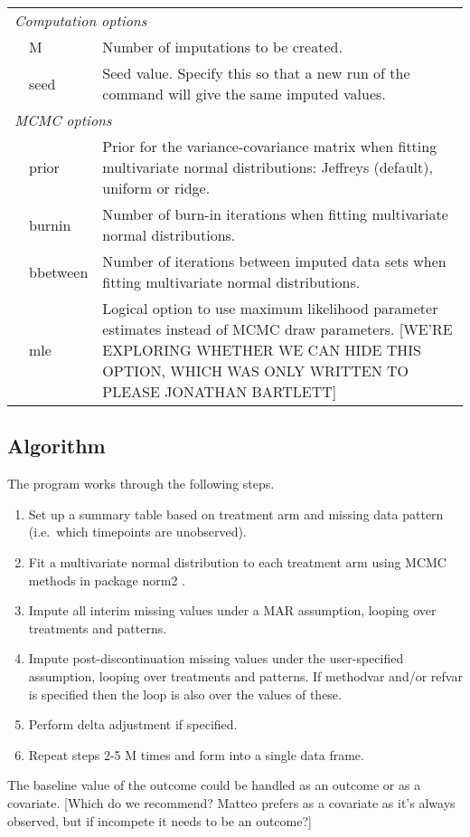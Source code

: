 \begin{tabular}{llp{.8\linewidth}}
\multicolumn{3}{l}{\em Computation options}\\
& M 	&	 Number of imputations to be created. \\
& seed 	&	 Seed value. Specify this so that a new run of the command will give the same imputed values.	\\

\multicolumn{3}{l}{\em MCMC options} \\
& prior 	&	 Prior for the variance-covariance matrix when fitting multivariate normal distributions: Jeffreys (default), uniform or ridge.	\\
& burnin 	&	 Number of burn-in iterations when fitting multivariate normal distributions.	\\
& bbetween 	&	 Number of iterations between imputed data sets when fitting multivariate normal distributions.	\\
& mle 	&	 Logical option to use maximum likelihood parameter estimates instead of MCMC draw parameters. 
[WE'RE EXPLORING WHETHER WE CAN HIDE THIS OPTION, WHICH WAS ONLY WRITTEN TO PLEASE JONATHAN BARTLETT]	\\ \hline
\end{tabular}

\subsection{Algorithm}

The program works through the following steps.
\begin{enumerate}
\item Set up a summary table based on treatment arm and missing data pattern (i.e.\ which timepoints are unobserved).
\item Fit a multivariate normal distribution to each treatment arm using MCMC methods in package norm2 \citep{norm2}.
\item Impute all interim missing values under a MAR assumption, looping over treatments and patterns.
\item Impute post-discontinuation missing values under the user-specified assumption, looping over treatments and patterns. If methodvar and/or refvar is specified then the loop is also over the values of these.
\item Perform delta adjustment if specified.
\item Repeat steps 2-5 M times and form into a single data frame.
\end{enumerate}

The baseline value of the outcome could be handled as an outcome or as a covariate. 
[Which do we recommend? Matteo prefers as a covariate as it's always observed, but if incompete it needs to be an outcome?] 

